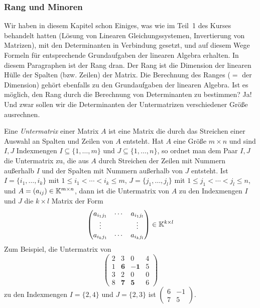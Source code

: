 \subsubsection{Rang und Minoren}

Wir haben in diesem Kapitel schon Einiges, was wie im Teil~1 des Kurses behandelt hatten (Lösung von Linearen Gleichungssystemen, Invertierung von Matrizen), mit den Determinanten in Verbindung gesetzt, und auf diesem Wege Formeln für  entsprechende Grundaufgaben der linearen Algebra erhalten. In diesem Paragraphen ist der Rang dran. Der Rang ist die Dimension der linearen Hülle der Spalten (bzw. Zeilen) der Matrix. Die Berechnung des Ranges ($=$ der Dimension) gehört ebenfalls zu den Grundaufgaben der linearen Algebra.  Ist es möglich, den Rang durch die Berechnung von Determinanten zu bestimmen? Ja! Und zwar sollen wir die Determinanten der Untermatrizen verschiedener Größe ausrechnen. 

Eine \emph{Untermatrix} einer Matrix $A$ ist eine Matrix die durch das Streichen einer Auswahl an Spalten und Zeilen von $A$ entsteht. Hat $A$ eine Größe $m \times n$ und sind $I, J$ Indexmengen $I \subseteq \{1,\ldots,m\}$ und $J \subseteq \{1,\ldots,n\}$, so ordnet man dem Paar $I, J$ die Untermatrix zu, die aus $A$ durch Streichen der Zeilen mit Nummern außerhalb $I$ und der Spalten mit Nummern außerhalb von $J$ entsteht. Ist $I= \{i_1,\ldots,i_k\}$ mit $1 \le i_1 < \cdots < i_k \le m$, $J = \{j_1,\ldots,j_l\}$ mit $1 \le j_1 < \cdots < j_l \le n$, und $A = (a_{ij}) \in \mathbb K^{m \times n}$, dann ist die Untermatrix von $A$ zu den Indexmengen $I$ und $J$ die $k \times l$ Matrix der Form
\begin{equation*}
	\begin{pmatrix}
		a_{{i_1}{j_1}} & \cdots & a_{{i_1}{j_l}} \\
		\vdots &  & \vdots \\
		a_{{i_k}{j_1}} & \cdots & a_{{i_k}{j_l}}
	\end{pmatrix} \in \mathbb K^{k \times l}
\end{equation*}
Zum Beispiel, die Untermatrix von
\[
	 \begin{pmatrix}
		2 & 3 & 0 & 4 \\
		1 & \mathbf{6} & \mathbf{-1} & 5 \\
		3 & 2 & 0 & 0 \\
		8 & \mathbf{7} & \mathbf{5} & 6
	\end{pmatrix} 
\]
zu den Indexmengen $I = \{2,4\}$ und $J=\{2,3\}$ ist 
	$ \begin{pmatrix}
		6 & -1 \\
		7 & 5
	\end{pmatrix} $.

